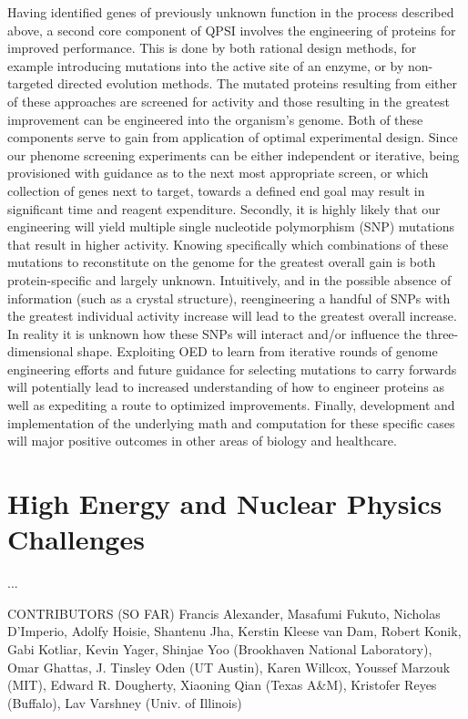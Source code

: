 \documentclass[11pt]{article}
\begin{document}
Having identified genes of previously unknown function in the process described above, a second core component of QPSI involves the engineering of proteins for improved performance. This is done by both rational design methods, for example introducing mutations into the active site of an enzyme, or by non-targeted directed evolution methods. The mutated proteins resulting from either of these approaches are screened for activity and those resulting in the greatest improvement can be engineered into the organism’s genome.
Both of these components serve to gain from application of optimal experimental design. Since our phenome screening experiments can be either independent or iterative, being provisioned with guidance as to the next most appropriate screen, or which collection of genes next to target, towards a defined end goal may result in significant time and reagent expenditure. Secondly, it is highly likely that our engineering will yield multiple single nucleotide polymorphism (SNP) mutations that result in higher activity. Knowing specifically which combinations of these mutations to reconstitute on the genome for the greatest overall gain is both protein-specific and largely unknown. Intuitively, and in the possible absence of information (such as a crystal structure), reengineering a handful of SNPs with the greatest individual activity increase will lead to the greatest overall increase. In reality it is unknown how these SNPs will interact and/or influence the three-dimensional shape. Exploiting OED to learn from iterative rounds of genome engineering efforts and future guidance for selecting mutations to carry forwards will potentially lead to increased understanding of how to engineer proteins as well as expediting a route to optimized improvements. Finally, development and implementation of the underlying math and computation for these specific cases will major positive outcomes in other areas of biology and healthcare.  

 



\section{High Energy and Nuclear Physics Challenges}
...

\newpage

\begin{center}
CONTRIBUTORS (SO FAR)
\normalsize Francis Alexander, Masafumi Fukuto, Nicholas D'Imperio, Adolfy Hoisie,
Shantenu Jha, Kerstin Kleese van Dam, Robert Konik, Gabi Kotliar,
Kevin Yager, Shinjae Yoo (Brookhaven National Laboratory), Omar
Ghattas, J. Tinsley Oden (UT Austin), Karen Willcox, Youssef Marzouk
(MIT), Edward R. Dougherty, Xiaoning Qian (Texas A\&M), Kristofer
Reyes (Buffalo), Lav Varshney (Univ. of Illinois)

\end{center}
\end{document}
